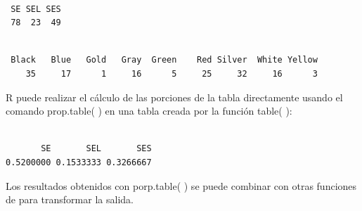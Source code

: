 \documentclass[
  letterpaper,
  DIV=11,
  numbers=noendperiod]{scrartcl}
\newenvironment{Shaded}{\begin{snugshade}}{\end{snugshade}}
\newcommand{\AttributeTok}[1]{\textcolor[rgb]{0.40,0.45,0.13}{#1}}
\newcommand{\DecValTok}[1]{\textcolor[rgb]{0.68,0.00,0.00}{#1}}
\newcommand{\FunctionTok}[1]{\textcolor[rgb]{0.28,0.35,0.67}{#1}}
\newcommand{\NormalTok}[1]{\textcolor[rgb]{0.00,0.23,0.31}{#1}}
\newcommand{\OtherTok}[1]{\textcolor[rgb]{0.00,0.23,0.31}{#1}}
\newcommand{\SpecialCharTok}[1]{\textcolor[rgb]{0.37,0.37,0.37}{#1}}
\begin{document}
\begin{Shaded}
\end{Shaded}

\begin{verbatim}

 SE SEL SES 
 78  23  49 
\end{verbatim}

\begin{Shaded}
\end{Shaded}

\begin{verbatim}

 Black   Blue   Gold   Gray  Green    Red Silver  White Yellow 
    35     17      1     16      5     25     32     16      3 
\end{verbatim}

R puede realizar el cálculo de las porciones de la tabla directamente
usando el comando prop.table( ) en una tabla creada por la función
table( ):

\begin{Shaded}
\end{Shaded}

\begin{verbatim}

       SE       SEL       SES 
0.5200000 0.1533333 0.3266667 
\end{verbatim}

Los resultados obtenidos con porp.table( ) se puede combinar con otras
funciones de para transformar la salida.

\begin{Shaded}
\end{Shaded}
\end{document}
